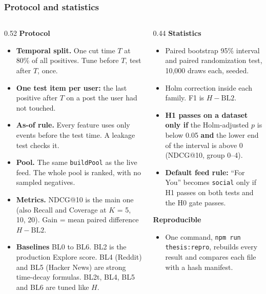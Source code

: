 \documentclass[aspectratio=169,11pt]{beamer}
\begin{document}
\begin{frame}
  \frametitle{Protocol and statistics}
  \begin{columns}[T]
    \begin{column}{0.52\textwidth}
      \textbf{Protocol}
      \begin{itemize}\footnotesize
        \item \textbf{Temporal split.} One cut time $T$ at 80\% of all positives. Tune before $T$, test after $T$, once.
        \item \textbf{One test item per user:} the last positive after $T$ on a post the user had not touched.
        \item \textbf{As-of rule.} Every feature uses only events before the test time. A leakage test checks it.
        \item \textbf{Pool.} The same \texttt{buildPool} as the live feed. The whole pool is ranked, with no sampled negatives.
        \item \textbf{Metrics.} NDCG@10 is the main one (also Recall and Coverage at $K$ = 5, 10, 20). Gain = mean paired difference $H - \text{BL2}$.
        \item \textbf{Baselines} BL0 to BL6. BL2 is the production Explore score. BL4 (Reddit) and BL5 (Hacker News) are strong time-decay formulas. BL2t, BL4, BL5 and BL6 are tuned like $H$.
      \end{itemize}
    \end{column}
    \begin{column}{0.44\textwidth}
      \textbf{Statistics}
      \begin{itemize}\footnotesize
        \item Paired bootstrap 95\% interval and paired randomization test, 10,000 draws each, seeded.
        \item Holm correction inside each family. F1 is $H - \text{BL2}$.
        \item \textbf{H1 passes on a dataset only if} the Holm-adjusted $p$ is below 0.05 \textbf{and} the lower end of the interval is above 0 (NDCG@10, group 0--4).
        \item \textbf{Default feed rule:} ``For You'' becomes \texttt{social} only if H1 passes on both tests and the H0 gate passes.
      \end{itemize}
      \vspace{1mm}
      \textbf{Reproducible}
      \begin{itemize}\footnotesize
        \item One command, \texttt{npm run thesis:repro}, rebuilds every result and compares each file with a hash manifest.
      \end{itemize}
    \end{column}
  \end{columns}
\end{frame}
\end{document}
